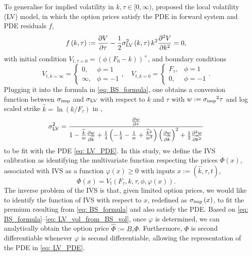 \documentclass[sigconf, authorversion=true, nonacm=true]{acmart}
\begin{document}
To generalise for implied volatility in $k, \tau \in [0, \infty)$, \cite{dupire1994pricing} proposed the local volatility (LV) model, in which the option prices satisfy the PDE in forward system \cite{andreasen2011volatility} and PDE residuals $f$,
\begin{equation}
    f\left(k, \tau\right) := \pdv{V}{\tau} - \frac{1}{2} \sigma_{\rm{LV}}^2 \left(k, \tau\right) k^2 \pdv[2]{V}{k} = 0,
    \label{eq: LV_PDE}
\end{equation}
with initial condition $V_{t, \tau=0} = \left(\phi(F_0 - k)\right)^+$, and boundary conditions 
\begin{equation}     
    V_{t, k=\infty} = \begin{cases}0,&\phi=1\\\infty,&\phi=-1\end{cases},\quad
    V_{t, k=0} = \begin{cases}F_\tau,&\phi=1\\0,&\phi=-1\end{cases}.
    \label{eq: boundary_conditions}
\end{equation}
Plugging it into the formula in \eqref{eq: BS_formula}, one obtains a conversion function between $\sigma_{\rm{imp}}$ and $\sigma_{\rm{LV}}$ with respect to $k$ and $\tau$ with $w:={\sigma_{\rm imp}}^2\tau$ and log scaled strike $\widehat{k}=\ln\left(k/F_\tau\right)$ in \cite{gatheral2011volatility},
\begin{equation}
    \sigma_{\rm LV}^2 =\frac{\pdv{w}{\tau}}{1-\frac{\widehat{k}}{w} \pdv{w}{\widehat{k}}+\frac{1}{4}\left(-\frac{1}{4}-\frac{1}{w}+\frac{\widehat{k}^2}{w^2}\right)\left(\pdv{w}{\widehat{k}}\right)^2+\frac{1}{2} \pdv[2]{w}{\widehat{k}}}
    \label{eq: LV_vol_from_BS_vol}
\end{equation}
to be fit with the PDE \eqref{eq: LV_PDE}.
In this study, we define the IVS calibration as identifying the multivariate function respecting the prices $\Phi\left(x\right)$, associated with IVS as a function $\varphi\left(x\right) \geq 0$ with inputs $x:=(\widehat{k}, \tau, t)$,
\begin{equation}
    \Phi(x) = V_t \left(F_\tau, k, \tau, \phi, \varphi\left(x\right)\right).
    \label{eq: price_function_by_Phi}
\end{equation}
The inverse problem of the IVS is that, given limited option prices, we would like to identify the function of IVS with respect to $x$, redefined as $\sigma_{\rm{imp}}\left(x\right)$, to fit the premium resulting from \eqref{eq: BS_formula} and also satisfy the PDE. Based on \eqref{eq: BS_formula}--\eqref{eq: LV_vol_from_BS_vol}, once $\varphi$ is determined, we can analytically obtain the option price $\widehat{\Phi}:=B_\tau\Phi$. Furthermore, $\Phi$ is second differentiable whenever $\varphi$ is second differentiable, allowing the representation of the PDE in \eqref{eq: LV_PDE}.
\end{document}
